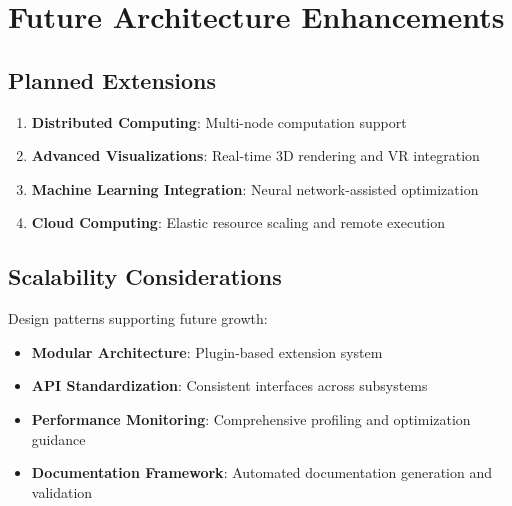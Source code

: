 \documentclass{article}
\begin{document}
\section{Future Architecture Enhancements}

\subsection{Planned Extensions}

\begin{enumerate}
\item \textbf{Distributed Computing}: Multi-node computation support
\item \textbf{Advanced Visualizations}: Real-time 3D rendering and VR integration
\item \textbf{Machine Learning Integration}: Neural network-assisted optimization
\item \textbf{Cloud Computing}: Elastic resource scaling and remote execution
\end{enumerate}

\subsection{Scalability Considerations}

Design patterns supporting future growth:

\begin{itemize}
\item \textbf{Modular Architecture}: Plugin-based extension system
\item \textbf{API Standardization}: Consistent interfaces across subsystems
\item \textbf{Performance Monitoring}: Comprehensive profiling and optimization guidance
\item \textbf{Documentation Framework}: Automated documentation generation and validation
\end{itemize}
\end{document}
